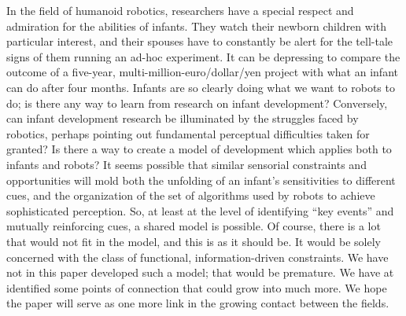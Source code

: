 


In the field of humanoid robotics, researchers have a special respect
and admiration for the abilities of infants.  They watch their newborn
children with particular interest, and their spouses have to
constantly be alert for the tell-tale signs of them running an ad-hoc
experiment.  It can be depressing to compare the outcome of a 
five-year, multi-million-euro/dollar/yen project with what an
infant can do after four months.  Infants are so clearly doing what
we want to robots to do; is there any way to learn from research
on infant development?
Conversely, can infant development research be illuminated by
the struggles faced by robotics, perhaps pointing out fundamental
perceptual difficulties taken for granted?
%
%
Is there a way to create a model of development which applies both to infants
and robots?
%
It seems possible that similar sensorial constraints and opportunities
will mold both the unfolding of an infant's sensitivities to
different cues, and the organization of the set of algorithms used by
robots to achieve sophisticated perception.
%
So, at least at the level of identifying ``key events'' and mutually
reinforcing cues, a shared model is possible.
%
%
%
%
%
Of course, there is a lot that would not fit in the model, and this is
as it should be.  It would be solely concerned with the class of 
functional, information-driven constraints.
%
We have not in this paper developed such a model; that would be
premature.  We have at identified some points of connection that could
grow into much more.  We hope the paper will serve as one more link in
the growing contact between the fields.






